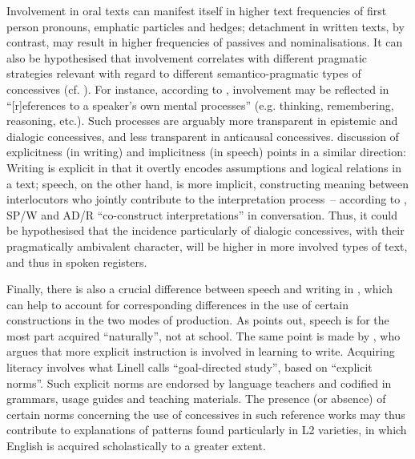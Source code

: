   Involvement in oral texts can manifest itself in higher text frequencies of first person pronouns, emphatic particles and hedges; detachment in written texts, by contrast, may result in higher frequencies of passives and nominalisations. It can also be hypothesised that involvement correlates with different pragmatic strategies relevant with regard to different semantico-pragmatic types of concessives (cf. ). For instance, according to \citet[45–48]{Chafe1982}, involvement may be reflected in “[r]eferences to a speaker’s own mental processes” (e.g. thinking, remembering, reasoning, etc.). Such processes are arguably more transparent in epistemic and dialogic concessives, and less transparent in anticausal concessives.  discussion of explicitness (in writing) and implicitness (in speech) points in a similar direction: Writing is explicit in that it overtly encodes assumptions and logical relations in a text; speech, on the other hand, is more implicit, constructing meaning between interlocutors who jointly contribute to the interpretation process~– according to \citet[18]{Linell2005}, SP/W and AD/R “co-construct inter\-pretations” in conversation. Thus, it could be hypothesised that the incidence partic\-u\-larly of dialogic concessives, with their pragmatically ambivalent character, will be higher in more involved types of text, and thus in spoken registers.

  Finally, there is also a crucial difference between speech and writing in , which can help to account for corresponding differences in the use of certain constructions in the two modes of production. As \citet[111]{Akinnaso1982} points out, speech is for the most part acquired “naturally”, not at school. The same point is made by \citet[23]{Linell2005}, who argues that more explicit instruction is involved in learning to write. Acquiring literacy involves what Linell calls “goal-directed study”, based on “explicit norms”. Such explicit norms are endorsed by language teachers and codified in grammars, usage guides and teaching materials. The presence (or absence) of certain norms concerning the use of concessives in such reference works may thus contribute to explanations of patterns found particularly in L2 varieties, in which English is acquired scholastically to a greater extent.

